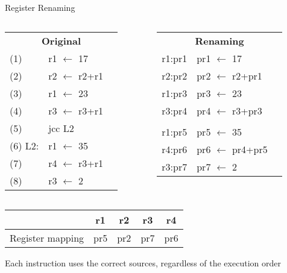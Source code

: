 \documentclass[aspectratio=169,12pt]{beamer}
\begin{document}
\begin{frame}{Register Renaming}
  \begin{columns}
    \begin{column}{0.5\textwidth}
      \begin{tabular}{lll}
        \multicolumn{3}{c}{\textbf{Original}} \\
        (1) & r1 $\leftarrow$ 17 & \\
        (2) & r2 $\leftarrow$ r2+r1 & \\
        (3) & r1 $\leftarrow$ 23 & \\
        (4) & r3 $\leftarrow$ r3+r1 & \\
        (5) & jcc L2 & \\
        (6) L2: & r1 $\leftarrow$ 35 & \\
        (7) & r4 $\leftarrow$ r3+r1 & \\
        (8) & r3 $\leftarrow$ 2 & \\
      \end{tabular}
    \end{column}
    
    \begin{column}{0.5\textwidth}
      \begin{tabular}{lll}
        \multicolumn{3}{c}{\textbf{Renaming}} \\
        r1:pr1 & pr1 $\leftarrow$ 17 & \\
        r2:pr2 & pr2 $\leftarrow$ r2+pr1 & \\
        r1:pr3 & pr3 $\leftarrow$ 23 & \\
        r3:pr4 & pr4 $\leftarrow$ r3+pr3 & \\
        & & \\
        r1:pr5 & pr5 $\leftarrow$ 35 & \\
        r4:pr6 & pr6 $\leftarrow$ pr4+pr5 & \\
        r3:pr7 & pr7 $\leftarrow$ 2 & \\
      \end{tabular}
    \end{column}
  \end{columns}
  
  \vspace{0.5cm}
  \begin{center}
    \begin{tabular}{|c|c|c|c|c|}
      \hline
      & r1 & r2 & r3 & r4 \\
      \hline
      Register mapping & pr5 & pr2 & pr7 & pr6 \\
      \hline
    \end{tabular}
  \end{center}
  
  \begin{center}
    \colorbox{green!30}{Each instruction uses the correct sources, regardless of the execution order}
  \end{center}
\end{frame}
\end{document}

